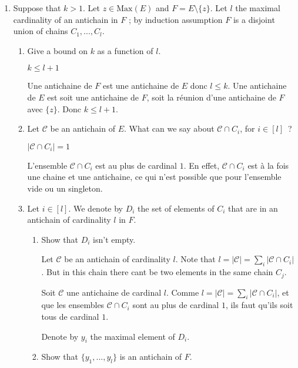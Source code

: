\documentclass[a4paper,11pt]{exam}
\begin{document}
\begin{questions}
\begin{enumerate}[resume]
			\item Suppose that $k>1$. Let $z\in \textrm{Max}(E)$ and $F =
			E\setminus\{z\}$. Let $l$ the maximal cardinality of an antichain in $F$ ; by induction assumption $F$ is a disjoint union of chains $C_1,...,C_l$.
			
			\begin{enumerate}
				\item Give a bound on $k$ as a function of $l$.
				
				\begin{solution}
					$k \leq l+1$
					
					Une antichaine de $F$ est une antichaine de $E$ donc $l \leq k$.
					Une antichaine de $E$ est soit une antichaine de $F$, soit la réunion d'une antichaine de $F$ avec $\{z\}$.
					Donc $k \leq l+1$.
				\end{solution}
				
				\item Let $ \mathcal{C}$ be an antichain of $E$. What can we say about
				$\mathcal{C}\cap C_i$, for $i\in [l]$~?
				\newcommand{\CC}{\mathcal{C}}
				
				\begin{solution}
					$|\CC \cap C_i|=1$
					
					L'ensemble $\CC \cap C_i$ est au plus de cardinal $1$.
					En effet, $\CC \cap C_i$ est à la fois une chaine et une
					antichaine, ce qui n'est possible que pour l'ensemble vide ou un
					singleton.
				\end{solution}
				
				\item Let $i\in [l]$. We denote by $D_i$
				the set of elements of $C_i$ that are in an antichain of cardinality $l$ in $F$.
				\begin{enumerate}
					\item Show that $D_i$ isn't empty.
					
					\begin{solution}
						Let $\CC$ be an antichain of cardinality $l$. Note that  $l = |\CC| = \sum_i |\CC \cap C_i|$. But in this chain there cant be two elements in the same chain $C_j$.
						
						Soit $\CC$ une antichaine de cardinal $l$. 
						Comme $l = |\CC| = \sum_i |\CC \cap C_i|$, et que les ensembles
						$\CC \cap C_i$ sont au plus de cardinal $1$, ils faut qu'ils
						soit tous de cardinal $1$.
					\end{solution}
					
					Denote by $y_i$ the maximal element of $D_i$.
					\item Show that  $\{y_1,...,y_l\}$ is an antichain of $F$.
					

\end{enumerate}
\end{enumerate}
\end{enumerate}
\end{questions}
\end{document}
